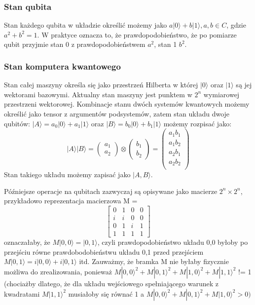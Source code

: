 \documentclass[12pt, letterpaper]{article}
\begin{document}
\subsubsection{Stan qubita}

Stan każdego qubita w układzie określić możemy jako $ a|0\rangle + b|1\rangle, a,b \in C  $, gdzie $ a^2 + b^2 = 1 $.
W praktyce oznacza to, że prawdopodobieństwo, że po pomiarze qubit przyjmie stan 0 z prawdopodobieństwem $a^2$, stan 1 $b^2$. 

\newpage
\subsubsection{Stan komputera kwantowego}

Stan całej maszyny określa się jako przestrzeń Hilberta w której $|0\rangle$ oraz $|1\rangle$ są jej wektorami bazowymi. \cite{pdf} Aktualny stan maszyny jest punktem w $2^n$ wymiarowej przestrzeni wektorowej. Kombinacje stanu dwóch systemów kwantowych możemy określić jako tensor z argumentów podsystemów, zatem stan układu dwoje qubitów: $|A\rangle = a_0|0\rangle + a_1|1\rangle$ oraz $|B\rangle = b_0|0\rangle + b_1|1\rangle$ możemy rozpisać jako: 
\[ |A\rangle|B\rangle = 
\left(\!
\begin{array}{c}
      a_1 \\
      a_2
    \end{array}
  \!\right)
  \otimes
  \left(\!
\begin{array}{c}
      b_1 \\
      b_2
    \end{array}
  \!\right) = 
  \left(\! 
\begin{array}{c}
      a_1b_1 \\
      a_1b_2 \\
      a_2b_1 \\
      a_2b_2 \\
    \end{array} 
  \!\right)
  \] 
Stan takiego układu możemy zapisać jako $|A,B\rangle$.

Późniejsze operacje na qubitach zazwyczaj są opisywane jako macierze $2^n \times 2^n$, przykładowo reprezentacja macierzowa M =\[
 \begin{bmatrix}
  0 & 1 & 0 & 0 \\
  i & i & 0 & 0 \\
  0 & 1 & i & 1 \\
  1 & 1 & 1 & 1
 \end{bmatrix}
\] 
oznaczałaby, że \newline
$M|0,0\rangle = |0,1\rangle$, czyli prawdopodobieństwo układu 0,0 byłoby po przejściu równe
prawdobodobieństwu układu 0,1 przed przejściem \newline 
$M|0,1\rangle = i|0,0\rangle + i|0,1\rangle$ itd. \newline
Zauważmy, że bramka M nie byłaby fizycznie możliwa do zrealizowania, ponieważ 
$ M|0,0\rangle^2 + M|0,1\rangle^2 + M|1,0\rangle^2 + M|1,1\rangle^2$ != 1 \newline (chociażby dlatego, że dla układu wejściowego spełniającego warunek z kwadratami $M|1,1\rangle^2$
musiałoby się równać 1 a $ M|0,0\rangle^2 + M|0,1\rangle^2 + M|1,0\rangle^2 > 0)$ 
\end{document}
